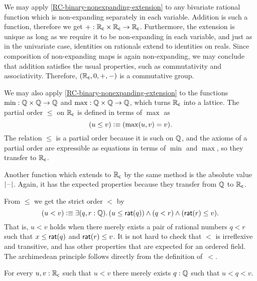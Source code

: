 We may apply \autoref{RC-binary-nonexpanding-extension} to any bivariate rational function
which is non-expanding separately in each variable. Addition is such a function, therefore
we get ${+} : \mathbb{R}_\mathsf{c} \times \mathbb{R}_\mathsf{c} \to \mathbb{R}_\mathsf{c}$.
%
Furthermore, the extension is unique as long as we
require it to be non-expanding in each variable, and just as in the univariate case,
identities on rationals extend to identities on reals. Since composition of non-expanding
maps is again non-expanding, we may conclude that addition satisfies the usual properties,
such as commutativity and associativity.
%
Therefore, $(\mathbb{R}_\mathsf{c}, 0, {+}, {-})$ is a commutative
group.

We may also apply \autoref{RC-binary-nonexpanding-extension} to the functions $\min : \mathbb{Q} \times
\mathbb{Q} \to \mathbb{Q}$ and $\max : \mathbb{Q} \times \mathbb{Q} \to \mathbb{Q}$, which turns $\mathbb{R}_\mathsf{c}$ into a lattice. The partial
order $\leq$ on $\mathbb{R}_\mathsf{c}$ is defined in terms of $\max$ as
%
%
%
\begin{equation*}
  (u \leq v) \vcentcolon\equiv (\max(u, v) = v).
\end{equation*}
%
The relation $\leq$ is a partial order because it is such on $\mathbb{Q}$, and the axioms of a
partial order are expressible as equations in terms of $\min$ and $\max$, so they transfer
to $\mathbb{R}_\mathsf{c}$.

%
Another function which extends to $\mathbb{R}_\mathsf{c}$ by the same method is the absolute value $|{\mathord{\hspace{1pt}\text{--}\hspace{1pt}}}|$.
Again, it has the expected properties because they transfer from $\mathbb{Q}$ to $\mathbb{R}_\mathsf{c}$.

From $\leq$ we get the strict order $<$ by
%
%
%
\begin{equation*}
  (u < v) \defeq \exis{q, r : \Q} (u \leq \rcrat(q)) \land (q < r) \land (\rcrat(r) \leq v).
\end{equation*}
%
That is, $u < v$ holds when there merely exists a pair of rational numbers $q < r$ such that $x \leq
\mathsf{rat}(q)$ and $\mathsf{rat}(r) \leq v$. It is not hard to check that $<$ is irreflexive and
transitive, and has other properties that are expected for an ordered field.
The archimedean principle follows directly from the definition of~$<$.

%
\begin{thm} \label{RC-archimedean}
  For every $u, v : \mathbb{R}_\mathsf{c}$ such that $u < v$ there merely exists $q : \mathbb{Q}$ such that $u < q < v$.
\end{thm}

